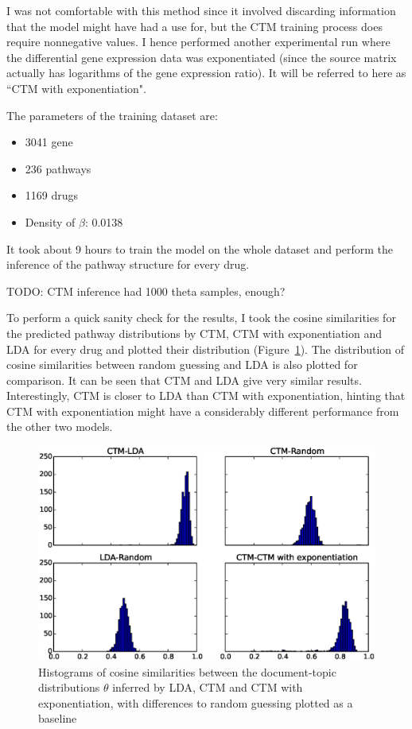 \documentclass[12pt,a4paper,twoside,openright]{report}
\begin{document}
I was not comfortable with this method since it involved discarding information that the model might have had a use for, but the CTM training process does require nonnegative values. I hence performed another experimental run where the differential gene expression data was exponentiated (since the source matrix actually has logarithms of the gene expression ratio). It will be referred to here as ``CTM with exponentiation".

The parameters of the training dataset are:
\begin{itemize}[noitemsep]
\item 3041 gene
\item 236 pathways
\item 1169 drugs
\item Density of $\beta$: 0.0138
\end{itemize}

It took about 9 hours to train the model on the whole dataset and perform the inference of the pathway structure for every drug.

TODO: CTM inference had 1000 theta samples, enough?

To perform a quick sanity check for the results, I took the cosine similarities for the predicted pathway distributions by CTM, CTM with exponentiation and LDA for every drug and plotted their distribution (Figure~\ref{fig:ctd-ctm-lda-diffs}). The distribution of cosine similarities between random guessing and LDA is also plotted for comparison. It can be seen that CTM and LDA give very similar results. Interestingly, CTM is closer to LDA than CTM with exponentiation, hinting that CTM with exponentiation might have a considerably different performance from the other two models.

\begin{figure}[!htb]
\includegraphics[width=\textwidth]{ctd-ctm-lda-diffs.eps}
\caption{Histograms of cosine similarities between the document-topic distributions $\theta$ inferred by LDA, CTM and CTM with exponentiation, with differences to random guessing plotted as a baseline}
\label{fig:ctd-ctm-lda-diffs}
\end{figure}
\end{document}
